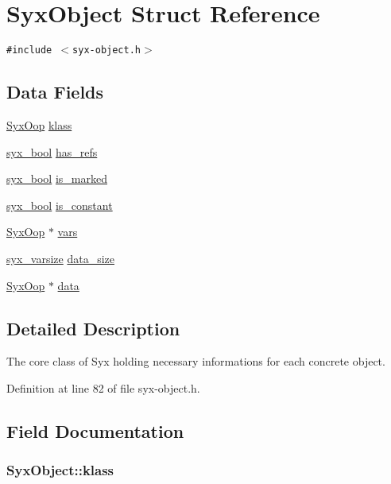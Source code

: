 \hypertarget{struct_syx_object}{
\section{SyxObject Struct Reference}
\label{struct_syx_object}
}
{\tt \#include $<$syx-object.h$>$}

\subsection*{Data Fields}
\begin{CompactItemize}
\item 
\hyperlink{syx-types_8h_1121caba2d40b2ce090b640762744ccd}{SyxOop} \hyperlink{struct_syx_object_8539164fe2b5659f7ea6c831f7e349a6}{klass}
\item 
\hyperlink{syx-types_8h_c6dc09b276b99fa1956364359139daab}{syx\_\-bool} \hyperlink{struct_syx_object_653836c4f8256fd84d945f5b37297475}{has\_\-refs}
\item 
\hyperlink{syx-types_8h_c6dc09b276b99fa1956364359139daab}{syx\_\-bool} \hyperlink{struct_syx_object_756671a0c1dddca22d76219e5e28c2c4}{is\_\-marked}
\item 
\hyperlink{syx-types_8h_c6dc09b276b99fa1956364359139daab}{syx\_\-bool} \hyperlink{struct_syx_object_a263627fc658b6d457bfa59962133612}{is\_\-constant}
\item 
\hyperlink{syx-types_8h_1121caba2d40b2ce090b640762744ccd}{SyxOop} $\ast$ \hyperlink{struct_syx_object_6f4addae6397d0901b4df39bc69621f9}{vars}
\item 
\hyperlink{syx-types_8h_18e1a1417591a1efb670b97ce320f535}{syx\_\-varsize} \hyperlink{struct_syx_object_9bde6747e06b47579dc52aa1c1bc878d}{data\_\-size}
\item 
\hyperlink{syx-types_8h_1121caba2d40b2ce090b640762744ccd}{SyxOop} $\ast$ \hyperlink{struct_syx_object_1613092e651dd77e4a0c1d0a1ec413cb}{data}
\end{CompactItemize}


\subsection{Detailed Description}
The core class of Syx holding necessary informations for each concrete object. 

Definition at line 82 of file syx-object.h.

\subsection{Field Documentation}
\hypertarget{struct_syx_object_8539164fe2b5659f7ea6c831f7e349a6}{
\subsubsection{ {\bf SyxObject::klass}}}
\label{struct_syx_object_8539164fe2b5659f7ea6c831f7e349a6}


